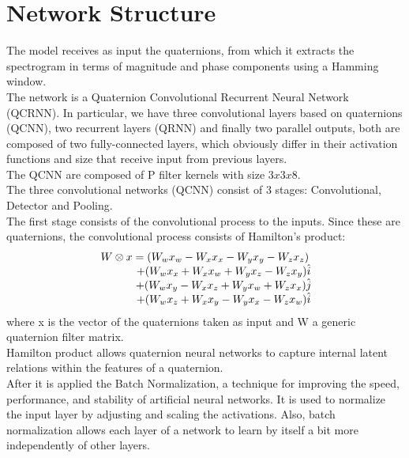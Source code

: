 \documentclass{article}
\begin{document}
    \section{Network Structure}
    The model receives as input the quaternions, from which it extracts the spectrogram in terms of magnitude and phase components 
    using a Hamming window.
    \\ The network is a Quaternion Convolutional Recurrent Neural Network (QCRNN).
    In particular, we have three convolutional layers based on quaternions (QCNN), two recurrent layers (QRNN) and finally two parallel 
    outputs, both are composed of two fully-connected layers, which obviously differ in their activation functions and size that 
    receive input from previous layers.
    \\ The QCNN are composed of P filter kernels with size $3x3x8$. 
    \\ The three convolutional networks (QCNN) consist of 3 stages: Convolutional, Detector and  Pooling.
    \\ The first stage consists of the convolutional process to the inputs. Since these are quaternions, the convolutional process 
    consists of Hamilton's product:
    \begin{equation*}
        \begin{matrix}
            W \otimes x =(W_wx_w - W_xx_x - W_yx_y - W_zx_z ) \\
               \hspace{1.2cm} + (W_wx_x + W_xx_w + W_yx_z - W_zx_y )\hat{i} \\
               \hspace{1.2cm} + (W_wx_y - W_xx_z + W_yx_w + W_zx_x )\hat{j} \\
               \hspace{1.2cm} + (W_wx_z + W_xx_y - W_yx_x - W_zx_w )\hat{i}
        \end{matrix}
    \end{equation*}
    where x is the vector of the quaternions taken as input and W a generic quaternion filter matrix.
    \\ Hamilton product allows quaternion neural networks to capture internal latent relations within the features of a quaternion.
    \\ After it is applied the Batch Normalization, a technique for improving the speed, performance, and stability of artificial 
    neural networks. It is used to normalize the input layer by adjusting and scaling the activations.
    Also, batch normalization allows each layer of a network to learn by itself a bit more independently of other layers.
\end{document}
